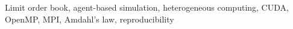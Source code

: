 Limit order book, agent-based simulation, heterogeneous computing, CUDA, OpenMP, MPI, Amdahl's law, reproducibility
